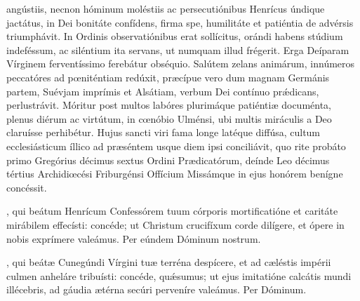\documentclass[fontsize=9pt,paper=A6,twoside,BCOR=1mm,DIV=22,headinclude]{scrarticle}
\begin{document}
\begin{multicols}{2}
{\RVCv 

 angústiis, necnon hóminum moléstiis ac persecutiónibus Henrícus úndique jactátus, in Dei bonitáte confídens, firma spe, humilitáte et patiéntia de advérsis triumphávit. In Ordinis observatiónibus erat sollícitus, orándi habens stúdium indeféssum, ac siléntium ita servans, ut numquam illud frégerit. Erga Deíparam Vírginem ferventíssimo ferebátur obséquio. Salútem zelans animárum, innúmeros peccatóres ad pœniténtiam redúxit, præcípue vero dum magnam Germánis partem, Suévjam imprímis et Alsátiam, verbum Dei contínuo pr\'ædicans, perlustrávit. Móritur post multos labóres plurimáque patiéntiæ documénta, plenus diérum ac virtútum, in cœnóbio Ulménsi, ubi multis miráculis a Deo claruísse perhibétur. Hujus sancti viri fama longe latéque diffúsa, cultum ecclesiásticum íllico ad præséntem usque diem ipsi conciliávit, quo rite probáto primo Gregórius décimus sextus Ordini Prædicatórum, deínde Leo décimus tértius Archidiœcési Friburgénsi Offícium Missámque in ejus honórem benígne concéssit.

\RVCvi 




\VRCii 

\BC 

, qui beátum Henrícum Confessórem tuum córporis mortificatióne et caritáte mirábilem effecísti: concéde; ut Christum crucifíxum corde dilígere, et ópere in nobis exprímere valeámus. Per eúndem Dóminum nostrum.



}



{

\VRVi 

\MiV 

, qui beátæ Cunegúndi Vírgini tuæ terréna despícere, et ad cæléstis impérii culmen anheláre tribuísti: concéde, qu\'æsumus; ut ejus imitatióne calcátis mundi illécebris, ad gáudia ætérna secúri perveníre valeámus. Per Dóminum.

}
\end{multicols}
\end{document}
